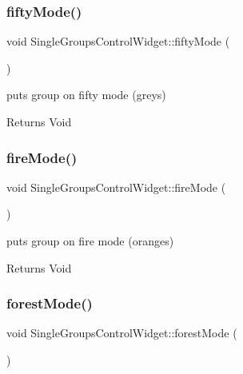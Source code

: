 \subsubsection{\texorpdfstring{fifty\+Mode()}{fiftyMode()}}
{\footnotesize\ttfamily void Single\+Groups\+Control\+Widget\+::fifty\+Mode (\begin{DoxyParamCaption}{ }\end{DoxyParamCaption})\hspace{0.3cm}{\ttfamily [private]}}



puts group on fifty mode (greys) 

\begin{DoxyReturn}{Returns}
Void 
\end{DoxyReturn}
\mbox{\label{class_single_groups_control_widget_a41395f061e8d93131b0e8c1b880eab59}} 
\subsubsection{\texorpdfstring{fire\+Mode()}{fireMode()}}
{\footnotesize\ttfamily void Single\+Groups\+Control\+Widget\+::fire\+Mode (\begin{DoxyParamCaption}{ }\end{DoxyParamCaption})\hspace{0.3cm}{\ttfamily [private]}}



puts group on fire mode (oranges) 

\begin{DoxyReturn}{Returns}
Void 
\end{DoxyReturn}
\mbox{\label{class_single_groups_control_widget_a6d940daceffefb6e5d17def4c4b24acc}} 
\subsubsection{\texorpdfstring{forest\+Mode()}{forestMode()}}
{\footnotesize\ttfamily void Single\+Groups\+Control\+Widget\+::forest\+Mode (\begin{DoxyParamCaption}{ }\end{DoxyParamCaption})\hspace{0.3cm}{\ttfamily [private]}}



